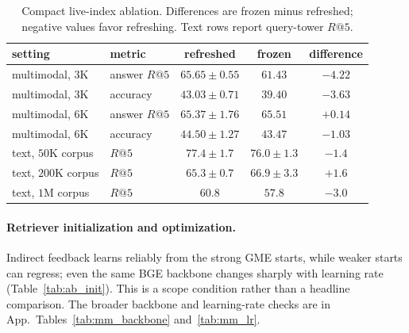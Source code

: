 \begin{table}[H]
\centering\scriptsize
\setlength{\tabcolsep}{4.2pt}
\caption{Compact live-index ablation. Differences are frozen minus refreshed; negative values favor
refreshing. Text rows report query-tower $R@5$.}
\label{tab:ab_refresh}
\begin{tabular}{llccc}
\toprule
setting & metric & refreshed & frozen & difference \\
\midrule
multimodal, $3$K & answer $R@5$ & $65.65 \pm 0.55$ & $61.43$ & $-4.22$ \\
multimodal, $3$K & accuracy & $43.03 \pm 0.71$ & $39.40$ & $-3.63$ \\
multimodal, $6$K & answer $R@5$ & $65.37 \pm 1.76$ & $65.51$ & $+0.14$ \\
multimodal, $6$K & accuracy & $44.50 \pm 1.27$ & $43.47$ & $-1.03$ \\
text, $50$K corpus & $R@5$ & $77.4 \pm 1.7$ & $76.0 \pm 1.3$ & $-1.4$ \\
text, $200$K corpus & $R@5$ & $65.3 \pm 0.7$ & $66.9 \pm 3.3$ & $+1.6$ \\
text, $1$M corpus & $R@5$ & $60.8$ & $57.8$ & $-3.0$ \\
\bottomrule
\end{tabular}
\end{table}

\paragraph{Retriever initialization and optimization.} Indirect feedback learns reliably from the
strong GME starts, while weaker starts can regress; even the same BGE backbone changes sharply with
learning rate (Table~\ref{tab:ab_init}). This is a scope condition rather than a headline comparison.
The broader backbone and learning-rate checks are in
App.~Tables~\ref{tab:mm_backbone} and~\ref{tab:mm_lr}.

